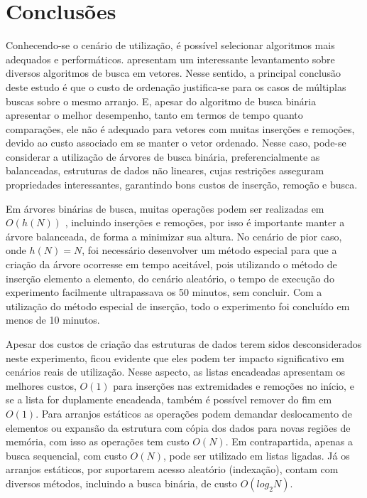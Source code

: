 \documentclass[12pt]{article}
\begin{document}
\section{Conclusões}

Conhecendo-se o cenário de utilização, é possível selecionar algoritmos mais adequados e performáticos. \cite{cappelle_searching_2021} apresentam um interessante levantamento sobre diversos algoritmos de busca em vetores. Nesse sentido, a principal conclusão deste estudo é que o custo de ordenação justifica-se para os casos de múltiplas buscas sobre o mesmo arranjo. E, apesar do algoritmo de busca binária apresentar o melhor desempenho, tanto em termos de tempo quanto comparações, ele não é adequado para vetores com muitas inserções e remoções, devido ao custo associado em se manter o vetor ordenado. Nesse caso, pode-se considerar a utilização de árvores de busca binária, preferencialmente as balanceadas, estruturas de dados não lineares, cujas restrições asseguram propriedades interessantes, garantindo bons custos de inserção, remoção e busca.

Em árvores binárias de busca, muitas operações podem ser realizadas em $O(h(N))$ \cite[p.71]{gonnet_handbook_1984}, incluindo inserções e remoções, por isso é importante manter a árvore balanceada, de forma a minimizar sua altura.
No cenário de pior caso, onde $h(N)=N$, foi necessário desenvolver um método especial para que a criação da árvore ocorresse em tempo aceitável, pois utilizando o método de inserção elemento a elemento, do cenário aleatório,
o tempo de execução do experimento facilmente ultrapassava os 50 minutos, sem concluir. Com a utilização do método especial de inserção, todo o experimento foi concluído em menos de 10 minutos.

Apesar dos custos de criação das estruturas de dados terem sidos desconsiderados neste experimento, ficou evidente que eles podem ter impacto significativo em cenários reais de utilização.
Nesse aspecto, as listas encadeadas apresentam os melhores custos, $O(1)$ para inserções nas extremidades e remoções no início, e se a lista for duplamente encadeada, também é possível remover do fim em $O(1)$.
Para arranjos estáticos as operações podem demandar deslocamento de elementos ou expansão da estrutura com cópia dos dados para novas regiões de memória, com isso as operações tem custo $O(N)$.
Em contrapartida, apenas a busca sequencial, com custo $O(N)$, pode ser utilizado em listas ligadas. Já os arranjos estáticos, por suportarem acesso aleatório (indexação), contam com diversos métodos, incluindo a busca binária, de custo $O(log_{2} N)$.
\end{document}
